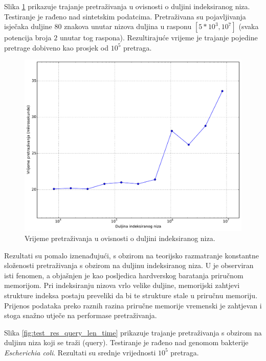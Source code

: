 \documentclass[times, utf8, seminar, numeric]{fer}
\begin{document}
Slika \ref{fig:test_res_seq_len_time} prikazuje
trajanje pretraživanja u ovisnosti o duljini indeksiranog niza.
Testiranje je rađeno nad sintetskim podatcima.
Pretraživana su pojavljivanja isječaka duljine 80 znakova unutar nizova duljina u rasponu
$[5 * 10^3, 10^7]$ (svaka potencija broja $2$ unutar tog raspona). Rezultirajuće vrijeme je trajanje
pojedine pretrage dobiveno kao prosjek od $10^5$ pretraga.

\begin{figure}[!htb]
\centering
\includegraphics[width=\textwidth]{fig/test_res_seq_len.pdf}
\caption{Vrijeme pretraživanja u ovisnosti o duljini indeksiranog niza.}
\label{fig:test_res_seq_len_time}
\end{figure}

Rezultati su pomalo iznenađujući, s obzirom na teorijsko razmatranje konstantne složenosti
pretraživanja s obzirom na duljinu indeksiranog niza. U \cite{singer_2012} je observiran
isti fenomen, a objašnjen je kao posljedica hardverskog baratanja priručnom memorijom. Pri indeksiranju
nizova vrlo velike duljine, memorijski zahtjevi strukture indeksa postaju preveliki da bi
te strukture stale u priručnu memoriju. Prijenos podataka preko raznih razina priručne memorije
vremenski je zahtjevan i stoga snažno utječe na performase pretraživanja.

Slika \ref{fig:test_res_query_len_time} prikazuje trajanje pretraživanja
s obzirom na duljinu niza koji se traži (query). Testiranje je rađeno nad genomom
bakterije \textit{Escherichia coli}. Rezultati su srednje vrijednosti $10^5$ pretraga.
\end{document}
